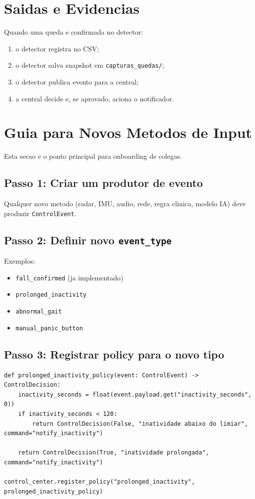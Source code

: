 \documentclass[12pt,a4paper]{article}
\begin{document}
\section{Saidas e Evidencias}
Quando uma queda e confirmada no detector:
\begin{enumerate}
    \item o detector registra no CSV;
    \item o detector salva snapshot em \texttt{capturas\_quedas/};
    \item o detector publica evento para a central;
    \item a central decide e, se aprovado, aciona o notificador.
\end{enumerate}

\section{Guia para Novos Metodos de Input}
Esta secao e o ponto principal para onboarding de colegas.

\subsection{Passo 1: Criar um produtor de evento}
Qualquer novo metodo (radar, IMU, audio, rede, regra clinica, modelo IA) deve produzir \texttt{ControlEvent}.

\subsection{Passo 2: Definir novo \texttt{event\_type}}
Exemplos:
\begin{itemize}
    \item \texttt{fall\_confirmed} (ja implementado)
    \item \texttt{prolonged\_inactivity}
    \item \texttt{abnormal\_gait}
    \item \texttt{manual\_panic\_button}
\end{itemize}

\subsection{Passo 3: Registrar policy para o novo tipo}
\begin{lstlisting}[style=py]
def prolonged_inactivity_policy(event: ControlEvent) -> ControlDecision:
    inactivity_seconds = float(event.payload.get("inactivity_seconds", 0))
    if inactivity_seconds < 120:
        return ControlDecision(False, "inatividade abaixo do limiar", command="notify_inactivity")

    return ControlDecision(True, "inatividade prolongada", command="notify_inactivity")

control_center.register_policy("prolonged_inactivity", prolonged_inactivity_policy)
\end{lstlisting}
\end{document}
